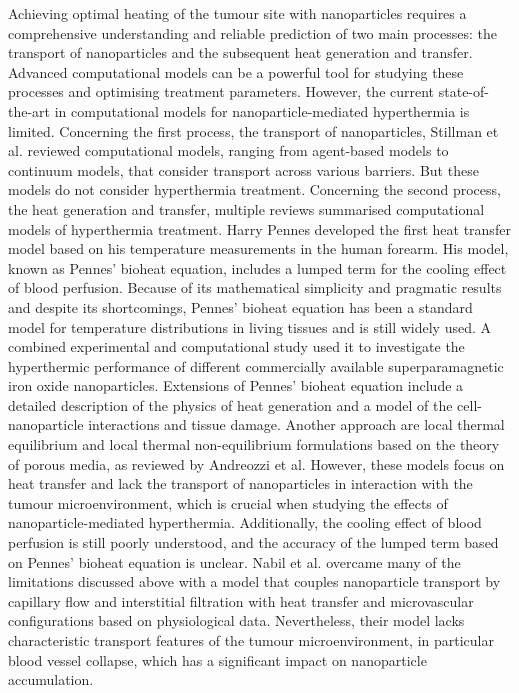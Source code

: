 \documentclass[Times1COL,AMA]{WileyNJDv5} %
\begin{document}
Achieving optimal heating of the tumour site with nanoparticles requires a comprehensive understanding and reliable prediction of two main processes:
the transport of nanoparticles and the subsequent heat generation and transfer.
Advanced computational models can be a powerful tool for studying these processes and optimising treatment parameters.
However, the current state-of-the-art in computational models for nanoparticle-mediated hyperthermia is limited.
Concerning the first process, the transport of nanoparticles, Stillman et al. \cite{Stillman2020} reviewed computational models, ranging from agent-based models to continuum models, that consider transport across various barriers.
But these models do not consider hyperthermia treatment.
Concerning the second process, the heat generation and transfer, multiple reviews \cite{Kaddi2013,Andreozzi2019,Suleman2021} summarised computational models of hyperthermia treatment.
Harry Pennes developed the first heat transfer model \cite{Pennes1948} based on his temperature measurements in the human forearm.
His model, known as Pennes' bioheat equation, includes a lumped term for the cooling effect of blood perfusion.
Because of its mathematical simplicity and pragmatic results and despite its shortcomings, Pennes' bioheat equation has been a standard model for temperature distributions in living tissues and is still widely used. \cite{Nelson1998,Becker2015}
A combined experimental and computational study \cite{Cervadoro2013} used it to investigate the hyperthermic performance of different commercially available superparamagnetic iron oxide nanoparticles.
Extensions of Pennes' bioheat equation include a detailed description of the physics of heat generation \cite{Liangruksa2011} and a model of the cell-nanoparticle interactions and tissue damage. \cite{Huang2010}
Another approach are local thermal equilibrium and local thermal non-equilibrium formulations based on the theory of porous media, as reviewed by Andreozzi et al. \cite{Andreozzi2019}
However, these models focus on heat transfer and lack the transport of nanoparticles in interaction with the tumour microenvironment, which is crucial when studying the effects of nanoparticle-mediated hyperthermia.
Additionally, the cooling effect of blood perfusion is still poorly understood, and the accuracy of the lumped term based on Pennes' bioheat equation is unclear.
Nabil et al. \cite{Nabil2015,Nabil2016} overcame many of the limitations discussed above with a model that couples nanoparticle transport by capillary flow and interstitial filtration with heat transfer and microvascular configurations based on physiological data.
Nevertheless, their model lacks characteristic transport features of the tumour microenvironment, in particular blood vessel collapse, which has a significant impact on nanoparticle accumulation.
\end{document}
